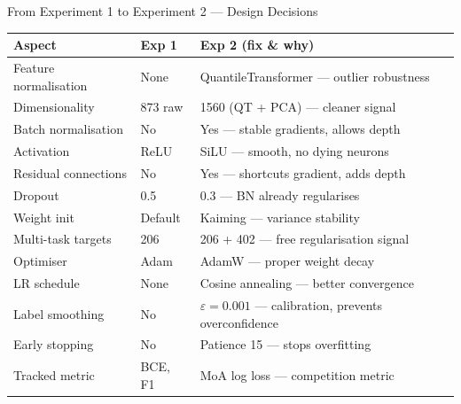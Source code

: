 \documentclass[aspectratio=169, 10pt]{beamer}
\begin{document}
\begin{frame}{From Experiment 1 to Experiment 2 — Design Decisions}
  \begin{table}
    \small
    \begin{tabular}{lll}
      \toprule
      \textbf{Aspect} & \textbf{Exp 1} & \textbf{Exp 2 (fix \& why)} \\
      \midrule
      Feature normalisation & None & QuantileTransformer — outlier robustness \\
      Dimensionality & 873 raw & 1560 (QT + PCA) — cleaner signal \\
      Batch normalisation & No & Yes — stable gradients, allows depth \\
      Activation & ReLU & SiLU — smooth, no dying neurons \\
      Residual connections & No & Yes — shortcuts gradient, adds depth \\
      Dropout & 0.5 & 0.3 — BN already regularises \\
      Weight init & Default & Kaiming — variance stability \\
      Multi-task targets & 206 & 206 + 402 — free regularisation signal \\
      Optimiser & Adam & AdamW — proper weight decay \\
      LR schedule & None & Cosine annealing — better convergence \\
      Label smoothing & No & $\varepsilon=0.001$ — calibration, prevents overconfidence \\
      Early stopping & No & Patience 15 — stops overfitting \\
      Tracked metric & BCE, F1 & MoA log loss — competition metric \\
      \bottomrule
    \end{tabular}
  \end{table}
\end{frame}
\end{document}
